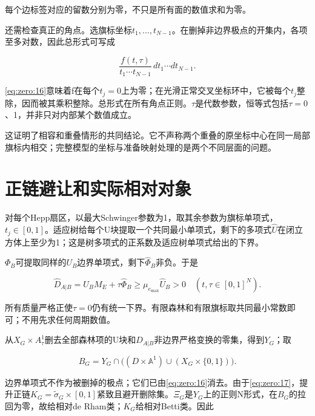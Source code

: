 \documentclass[11pt,a4paper,oneside]{ctexrep}
\theoremstyle{cnplain}
\theoremstyle{definition}
\theoremstyle{remark}
\begin{document}
每个边标签对应的留数分别为零，不只是所有面的数值求和为零。

还需检查真正的角点。选旗标坐标\(t_1,...,t_{N- 1}\)。在删掉非边界极点的开集内，各项至多对数，因此总形式可写成

\begin{equation}
\frac{f(t,\tau)}{t_1\cdots t_{N-1}}\,
                 dt_1\cdots dt_{N-1}.
\end{equation}

\eqref{eq:zero:16}意味着f在每个\(t_j=0\)上为零；在光滑正常交叉坐标环中，它被每个\(t_j\)整除，因而被其乘积整除。总形式在所有角点正则。\(\tau \)是代数参数，恒等式包括\(\tau =0\)、1，并非只对内部某个数值成立。

这证明了相容和重叠情形的共同结论。它不声称两个重叠的原坐标中心在同一局部旗标内相交；完整模型的坐标与准备映射处理的是两个不同层面的问题。

\section{正链避让和实际相对对象}\label{sec:zero:7}

对每个Hepp扇区，以最大Schwinger参数为1，取其余参数为旗标单项式，\(t_j\in [0,1]\)。适应树给每个U块提取一个共同最小单项式，剩下的多项式\(\widehat U\)在闭立方体上至少为1；这是树多项式的正系数及适应树单项式给出的下界。

\(\Phi _B\)可提取同样的\(U_B\)边界单项式，剩下\(\widehat \Phi _B\)非负。于是

\begin{equation}
\widehat D_{A|B}
    =\widehat U_B M_E+\tau\widehat\Phi_B
       \geq\mu_{e_{\max}}\widehat U_B>0
           \quad (t,\tau\in[0,1]^{N}).                        \label{eq:zero:17}
\end{equation}

所有质量严格正使\(\tau =0\)仍有统一下界。有限森林和有限旗标取共同最小常数即可；不用先求任何周期数值。

从\(X_G\times A^{1}_\tau \)删去全部森林项的U块和\(D_{A|B}\)非边界严格变换的零集，得到\(Y_G\)；取

\begin{equation}
B_G=Y_G\cap\bigl((D\times\mathbb A^1)
                  \cup(X_G\times\{0,1\})\bigr).              \label{eq:zero:18}
\end{equation}

边界单项式不作为被删掉的极点；它们已由\eqref{eq:zero:16}消去。由于\eqref{eq:zero:17}，提升正链\(K_G=\widetilde\sigma _G\times [0,1]\)紧致且避开删除集。\(\Xi _G\)是\(Y_G\)上的正则N形式，在\(B_G\)的拉回为零，故给相对de Rham类；\(K_G\)给相对Betti类。因此
\end{document}
